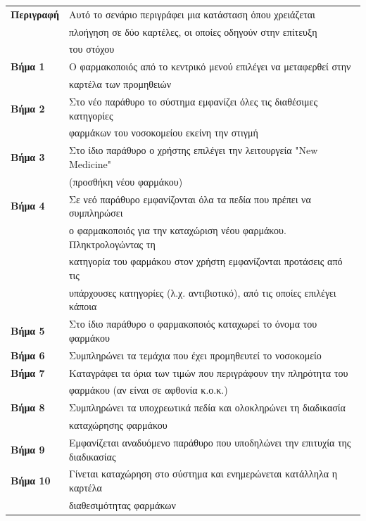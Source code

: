 \documentclass{article}
\newcommand\T{\rule{0pt}{2.6ex}}       %
\newcommand\B{\rule[-1.2ex]{0pt}{0pt}}
\begin{document}
 \begin{center}
     \begin{tabular}{|l|l|}
     \hline
      \textbf{Περιγραφή} & Αυτό το σενάριο περιγράφει μια κατάσταση όπου χρειάζεται \T \\& πλοήγηση σε δύο καρτέλες, οι οποίες οδηγούν στην επίτευξη \\& του στόχου \B \\ 
      \hline
      \textbf{Βήμα 1} & Ο φαρμακοποιός από το κεντρικό μενού επιλέγει να μεταφερθεί στην \T \\& καρτέλα των προμηθειών \B \\
      \hline
      \textbf{Βήμα 2} & Στο νέο παράθυρο το σύστημα εμφανίζει όλες τις διαθέσιμες κατηγορίες \T \\& φαρμάκων του νοσοκομείου εκείνη την στιγμή \B \\
      \hline
      \textbf{Βήμα 3} & Στο ίδιο παράθυρο ο χρήστης επιλέγει την λειτουργεία "New Medicine" \T \\& (προσθήκη νέου φαρμάκου) \B \\
      \hline
      \textbf{Βήμα 4} & Σε νεό παράθυρο εμφανίζονται όλα τα πεδία που πρέπει να συμπληρώσει \T \\&  ο φαρμακοποιός για την καταχώριση νέου φαρμάκου. Πληκτρολογώντας τη \\& κατηγορία του φαρμάκου στον χρήστη εμφανίζονται προτάσεις από τις \\& υπάρχουσες κατηγορίες  (λ.χ. αντιβιοτικό), από τις οποίες επιλέγει κάποια \B \\
      \hline
      \textbf{Βήμα 5} & Στο ίδιο παράθυρο ο φαρμακοποιός καταχωρεί το όνομα του φαρμάκου \T\B \\
      \hline
      \textbf{Βήμα 6} &  Συμπληρώνει τα τεμάχια που έχει προμηθευτεί το νοσοκομείο \T\B \\
      \hline
      \textbf{Βήμα 7} & Καταγράφει τα όρια των τιμών που περιγράφουν την πληρότητα του \T \\& φαρμάκου (αν είναι σε αφθονία κ.ο.κ.)\B \\
      \hline
      \textbf{Βήμα 8} & Συμπληρώνει τα υποχρεωτικά πεδία και ολοκληρώνει τη διαδικασία \T \\& καταχώρησης φαρμάκου \B \\
      \hline
      \textbf{Βήμα 9} & Εμφανίζεται αναδυόμενο παράθυρο που υποδηλώνει την επιτυχία της διαδικασίας \T\B \\
      \hline    
      \textbf{Βήμα 10} & Γίνεται καταχώρηση στο σύστημα και ενημερώνεται κατάλληλα η καρτέλα \T \\& διαθεσιμότητας φαρμάκων \B \\
      \hline
     \end{tabular}
 \end{center}
 
\end{document}
